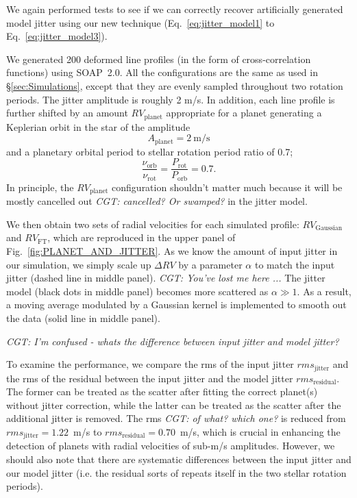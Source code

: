 We again performed tests to see if we can correctly recover artificially generated model jitter using our new technique (Eq.~\ref{eq:jitter_model1} to Eq.~\ref{eq:jitter_model3}).

We generated 200 deformed line profiles (in the form of cross-correlation functions) using SOAP~2.0. All the configurations are the same as used in \S\ref{sec:Simulations}, except that they are evenly sampled throughout two rotation periods. The jitter amplitude is roughly 2 m/s. In addition, each line profile is further shifted by an amount $RV_\text{planet}$ appropriate for a planet generating a Keplerian orbit in the star of  the amplitude
\begin{equation*}
	A_\text{planet} = 2~\text{m/s}
\end{equation*}
and a planetary orbital period to stellar rotation period ratio of 0.7;
\begin{equation*}
	\frac{\nu_\text{orb}}{\nu_\text{rot}} = \frac{P_\text{rot}}{P_\text{orb}} = 0.7.
\end{equation*}
In principle, the $RV_\text{planet}$ configuration shouldn't matter much 
because it will be mostly cancelled out {\em CGT: cancelled? Or swamped?} in the jitter model. 

We then obtain two sets of radial velocities for each simulated profile: 
$RV_\text{Gaussian}$ and $RV_\text{FT}$, which are reproduced in the upper panel of Fig.~\ref{fig:PLANET_AND_JITTER}. 
As we know the amount of input jitter in our simulation, we simply scale up $\Delta RV$ by a parameter $\alpha$
to match the input jitter (dashed line in middle panel). {\em CGT: You've lost me here ...}
The jitter model (black dots in middle panel) becomes more scattered as $\alpha \gg 1$.  
As a result, a moving average modulated by a Gaussian kernel is implemented to smooth out the data (solid line 
in middle panel).

{\em CGT: I'm confused - whats the difference between input jitter and model jitter?}

To examine the performance, we compare the rms of the input jitter $rms_\text{jitter}$
and the rms of the residual between the input jitter and the model jitter $rms_\text{residual}$. 
The former can be treated as the scatter after fitting the correct planet(s) without jitter correction, 
while the latter can be treated as the scatter after the additional jitter is removed.
The rms {\em CGT: of what? which one?} is reduced from $rms_\text{jitter} = 1.22$~m/s to $rms_\text{residual} = 0.70$~m/s,
which is crucial in enhancing the detection of planets with radial velocities of sub-m/s amplitudes. 
However, we should also note that there are systematic differences between the input jitter and our model jitter
(i.e. the residual sorts of repeats itself in the two stellar rotation periods). 

